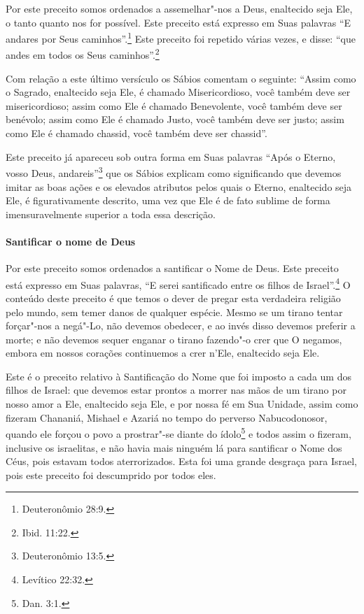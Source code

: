 \begin{multicols}{2}
Por este preceito somos ordenados a assemelhar"-nos a Deus, enaltecido
seja Ele, o tanto quanto nos for possível. Este preceito está expresso
em Suas palavras ``E andares por Seus caminhos''.\footnote{Deuteronômio 28:9.}
Este preceito foi repetido várias vezes, e disse: ``que andes em todos os Seus
caminhos''.\footnote{Ibid. 11:22.}

Com relação a este último versículo os Sábios comentam o seguinte:
``Assim como o Sagrado, enaltecido seja Ele, é chamado Misericordioso,
você também deve ser misericordioso; assim como Ele é chamado
Benevolente, você também deve ser benévolo; assim como Ele é chamado
Justo, você também deve ser justo; assim como Ele é chamado chassid\starr,
você também deve ser chassid\starr''.

Este preceito já apareceu sob outra forma em Suas palavras ``Após o
Eterno, vosso Deus, andareis''\footnote{Deuteronômio 13:5.} que os Sábios
explicam como significando que devemos imitar as boas ações e os
elevados atributos pelos quais o Eterno, enaltecido seja Ele, é
figurativamente descrito, uma vez que Ele é de fato sublime de forma
imensuravelmente superior a toda essa descrição.



\paragraph{Santificar o nome de Deus}

Por este preceito somos ordenados a santificar o Nome de Deus. Este
preceito está expresso em Suas palavras, ``E serei santificado entre os
filhos de Israel''.\footnote{Levítico 22:32.} O conteúdo deste preceito é que
temos o dever de pregar esta verdadeira religião pelo mundo, sem temer
danos de qualquer espécie. Mesmo se um tirano tentar forçar"-nos a
negá"-Lo, não devemos obedecer, e ao invés disso devemos preferir a
morte; e não devemos sequer enganar o tirano fazendo"-o crer que O
negamos, embora em nossos corações continuemos a crer n'Ele, enaltecido
seja Ele.

Este é o preceito relativo à Santificação do Nome que foi imposto a cada
um dos filhos de Israel: que devemos estar prontos a morrer nas mãos de
um tirano por nosso amor a Ele, enaltecido seja Ele, e por nossa fé em
Sua Unidade, assim como fizeram Chananiá\starr, Mishael\starr{} e Azariá\starr{} no tempo do perverso
Nabucodonosor, quando ele forçou o povo a prostrar"-se diante do
ídolo\footnote{Dan. 3:1.} e todos assim o fizeram, inclusive os
israelitas, e não havia mais ninguém lá para santificar o Nome dos
Céus, pois estavam todos aterrorizados. Esta foi uma grande desgraça
para Israel, pois este preceito foi descumprido por todos eles.


\end{multicols}
